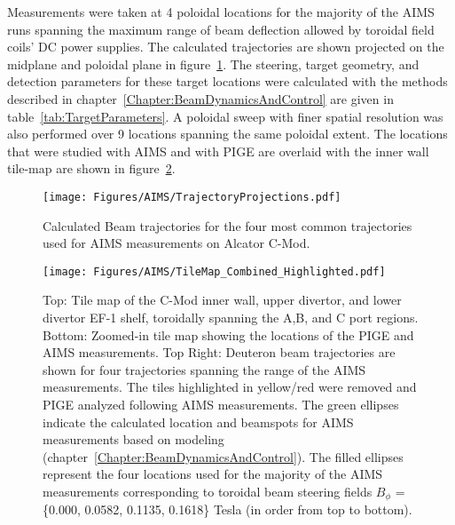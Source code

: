 \documentclass[11pt,a4paper,twocolumn]{article}
\begin{document}
%
%
\label{sec:AIMSPIGEGeometry}
Measurements were taken at 4 poloidal locations for the majority of the AIMS runs spanning the maximum range of beam deflection allowed by toroidal field coils' DC power supplies. The calculated trajectories are shown projected on the midplane and poloidal plane in figure~\ref{fig:TrajectoryProjections}.  The steering, target geometry, and detection  parameters for these target locations were calculated with the methods described in chapter~\ref{Chapter:BeamDynamicsAndControl} are given in table~\ref{tab:TargetParameters}.  A poloidal sweep with finer spatial resolution was also performed over 9 locations spanning the same poloidal extent.  The locations that were studied with AIMS and with PIGE are overlaid with the inner wall tile-map are shown in figure~\ref{fig:TileMap0}. %
%
\begin{figure}[h!]
 \centering
  \texttt{[image: Figures/AIMS/TrajectoryProjections.pdf]}
 \caption{Calculated Beam trajectories for the four most common trajectories used
for AIMS measurements on Alcator C-Mod.}
 \label{fig:TrajectoryProjections}
\end{figure}
%
%
\begin{figure}[p]
 \centering
  \texttt{[image: Figures/AIMS/TileMap\_Combined\_Highlighted.pdf]}
 \caption{\small Top: Tile map of the C-Mod inner wall, upper divertor, and lower divertor EF-1 shelf, toroidally spanning the A,B, and C port regions. Bottom: Zoomed-in tile map showing the locations of the PIGE and AIMS measurements.  Top Right: Deuteron beam trajectories are shown for four trajectories spanning the range of the AIMS measurements. The tiles highlighted in yellow/red were removed and PIGE analyzed following AIMS measurements.  The green ellipses indicate the calculated location and beamspots for AIMS measurements based on modeling (chapter~\ref{Chapter:BeamDynamicsAndControl}).  The filled ellipses represent the four locations used for the majority of the AIMS measurements corresponding to toroidal beam steering fields $B_\phi$ = \{0.000, 0.0582, 0.1135, 0.1618\} Tesla (in order from top to bottom).  }
 \label{fig:TileMap0}
\end{figure}
\end{document}
